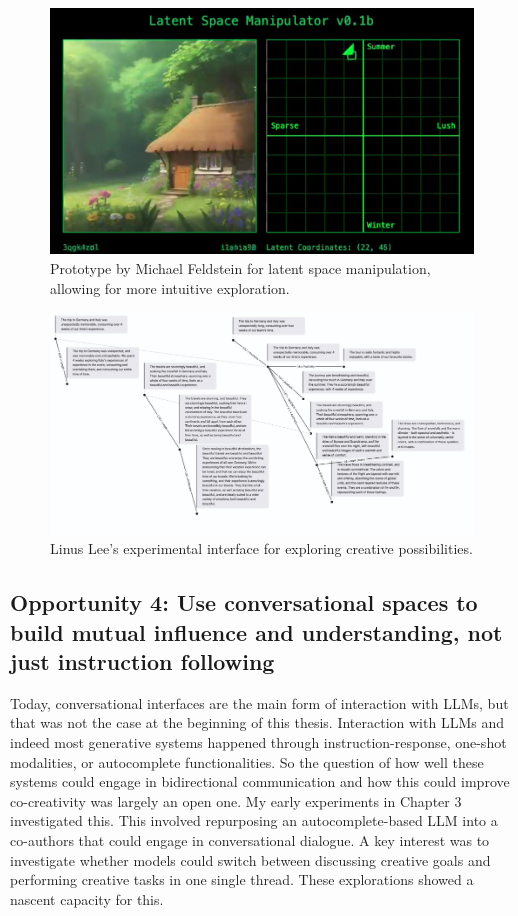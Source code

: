 \begin{figure}[H]
    \centering
    \includegraphics[width=0.8\linewidth]{latentspacemanip.png}
    \caption{Prototype by Michael Feldstein for latent space manipulation, allowing for more intuitive exploration.}
    \label{fig:feldstein}
\end{figure}

\begin{figure}[H]
    \centering
    \includegraphics[width=0.8\linewidth]{linus.png}
    \caption{Linus Lee's experimental interface for exploring creative possibilities.}
    \label{fig:linus}
\end{figure}



\subsection{Opportunity 4: Use conversational spaces to build mutual influence and understanding, not just instruction following}

Today, conversational interfaces are the main form of interaction with LLMs, but that was not the case at the beginning of this thesis. Interaction with LLMs and indeed most generative systems happened through instruction-response, one-shot modalities, or autocomplete functionalities. So the question of how well these systems could engage in bidirectional communication and how this could improve co-creativity was largely an open one.  My early experiments in Chapter 3 investigated this. This involved repurposing an autocomplete-based LLM into a co-authors that could engage in conversational dialogue. A key interest was to investigate whether models could switch between discussing creative goals and performing creative tasks in one single thread. These explorations showed a nascent capacity for this.


